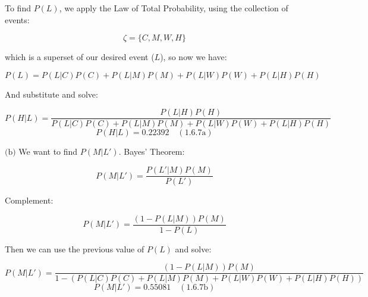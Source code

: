 \documentclass{article}
\newcommand{\subproblem}[3]{$\boxed{\text{(#3)}}$}
\newcommand{\subsolution}[4]{\boxed{#4\quad(\text{#1.#2#3})}}
\begin{document}
To find $P(L)$, we apply the Law of Total Probability, using the
collection of events:

\[
\zeta=\{C,M,W,H\}
\]

which is a superset of our desired event ($L$), so now we have:

\[
P(L)=P(L|C)P(C)+P(L|M)P(M)+P(L|W)P(W)+P(L|H)P(H)
\]

And substitute and solve:

\[
P(H|L)=\dfrac{P(L|H)P(H)}{P(L|C)P(C)+P(L|M)P(M)+P(L|W)P(W)+P(L|H)P(H)}
\] \[
\subsolution{1.6}{7}{a}{P(H|L)=0.22392}
\]

%
\subproblem{1.6}{7}{b} We want to find $P(M|L')$. Bayes' Theorem:

\[
P(M|L')=\dfrac{P(L'|M)P(M)}{P(L')}
\]

Complement:

\[
P(M|L')=\dfrac{(1-P(L|M))P(M)}{1-P(L)}
\]

Then we can use the previous value of $P(L)$ and solve:

\[
P(M|L')=\dfrac{(1-P(L|M))P(M)}{1-(P(L|C)P(C)+P(L|M)P(M)+P(L|W)P(W)+P(L|H)P(H))}
\] \[
\subsolution{1.6}{7}{b}{P(M|L')=0.55081}
\]
\end{document}
